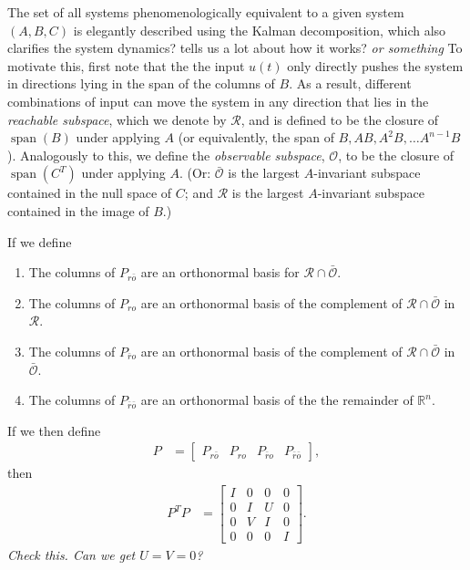 \documentclass[11 pt]{article}
\newcommand{\plr}[1]{{\color{blue}\it #1}}
\newcommand{\ro}{{ro}}
\newcommand{\nro}{{\bar{r}o}}
\newcommand{\rno}{{r\bar{o}}}
\newcommand{\nrno}{{\bar{r}\bar{o}}}
\newcommand{\reachable}{\mathcal{R}}
\newcommand{\unobservable}{\bar{\mathcal{O}}}
\newcommand{\R}{\mathbb{R}}
\DeclareMathOperator{\spn}{span}
\begin{document}
The set of all systems phenomenologically equivalent to a given system $(A,B,C)$ 
is elegantly described using the Kalman decomposition,
which also clarifies the system dynamics? tells us a lot about how it works? \plr{or something}
To motivate this, first note that the the input $u(t)$ only directly pushes the system
in directions lying in the span of the columns of $B$.
As a result, different combinations of input can 
move the system in any direction that lies in the \emph{reachable subspace},
which we denote by $\reachable$,
and is defined to be the closure of $\spn(B)$ under applying $A$
(or equivalently, the span of $B, AB, A^2B, \ldots A^{n-1}B$).
Analogously to this, we define
the \emph{observable subspace}, $\mathcal{O}$,
to be the closure of $\spn(C^T)$ under applying $A$.
(Or: $\unobservable$ is the largest $A$-invariant subspace
contained in the null space of $C$;
and $\reachable$ is the largest $A$-invariant subspace contained in the image of $B$.)

If we define
\begin{enumerate}
    \item The columns of $P_\rno$ are an orthonormal basis for $\reachable \cap \unobservable$.
    \item The columns of $P_\ro$ are an orthonormal basis of
        the complement of $\reachable \cap \unobservable$ in $\reachable$.
    \item The columns of $P_\nro$ are an orthonormal basis of
        the complement of $\reachable \cap \unobservable$ in $\unobservable$.
    \item The columns of $P_\nrno$ are an orthonormal basis of
        the the remainder of $\R^n$.
\end{enumerate}
If we then define
\begin{align*}
    P &= 
    \left[ \begin{array}{c|c|c|c}
        P_\rno & P_\ro & P_\nro & P_\nrno
    \end{array} \right] ,
\end{align*}
then
\begin{align*}
    P^T P
    &=
    \left[ \begin{array}{c|c|c|c}
        I & 0 & 0 & 0 \\
        \hline
        0 & I & U & 0 \\
        \hline
        0 & V & I & 0 \\
        \hline
        0 & 0 & 0 & I 
    \end{array} \right] .
\end{align*}
\plr{Check this.  Can we get $U=V=0$?}
\end{document}
